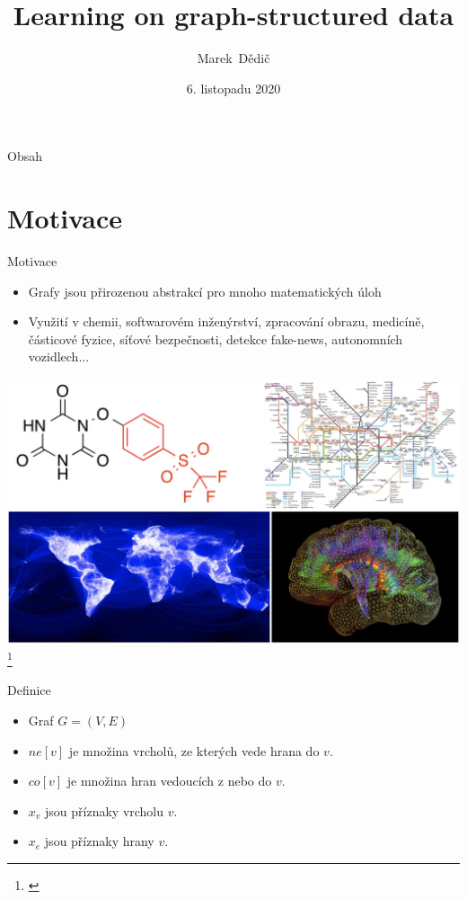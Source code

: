\documentclass[10pt]{beamer}
\title[Learning on graph-structured data]
{
	Learning on graph-structured data
}
\date[6. 11. 2020]{6. listopadu 2020}
\author[Marek Dědič]
{
	Marek~Dědič\inst{1}
}
\institute[FJFI ČVUT]
{
	\inst{1} ČVUT v Praze, Fakulta jaderná a fyzikálně inženýrská
}
\begin{document}
\begin{frame}
	\titlepage
\end{frame}

\begin{frame}{Obsah}
	\tableofcontents
\end{frame}


\section{Motivace}

\begin{frame}{Motivace}
	\begin{itemize}
		\item Grafy jsou přirozenou abstrakcí pro mnoho matematických úloh
		\item Využití v chemii, softwarovém inženýrství, zpracování obrazu, medicíně, částicové fyzice, síťové bezpečnosti, detekce fake-news, autonomních vozidlech...
	\end{itemize}
	\centering
	\includegraphics[width=0.7\pagewidth]{images/graphs.png}\footnote{\cite{velickovic_opening_2020}}
\end{frame}

\begin{frame}{Definice}
	\begin{itemize}
		\item Graf \( G = \left( V, E \right) \)
		\item \( ne \left[ v \right] \) je množina vrcholů, ze kterých vede hrana do \( v \).
		\item \( co \left[ v \right] \) je množina hran vedoucích z nebo do \( v \).
		\item \( x_v \) jsou příznaky vrcholu \( v \).
		\item \( x_e \) jsou příznaky hrany \( v \).
	\end{itemize}
\end{frame}
\end{document}
